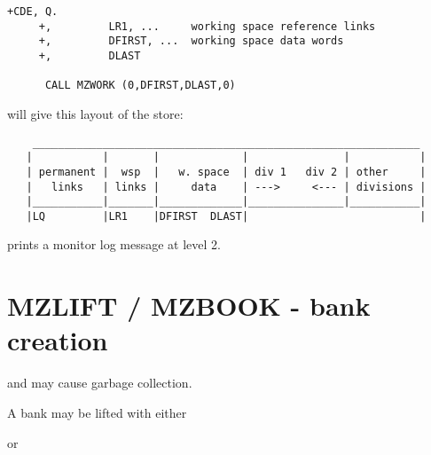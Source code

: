 \Example

\begin{verbatim}
+CDE, Q.
     +,         LR1, ...     working space reference links
     +,         DFIRST, ...  working space data words
     +,         DLAST

      CALL MZWORK (0,DFIRST,DLAST,0)
\end{verbatim} 

will give this layout of the store:

\begin{verbatim}
    _____________________________________________________________
   |           |       |             |               |           |
   | permanent |  wsp  |   w. space  | div 1   div 2 | other     |
   |   links   | links |     data    | --->     <--- | divisions |
   |___________|_______|_____________|_______________|___________|
   |LQ         |LR1    |DFIRST  DLAST|                           |
\end{verbatim} 

 prints a monitor log message at level 2.

\section{MZLIFT / MZBOOK - bank creation}

 and  may cause garbage collection.

A bank may be lifted with either


or


